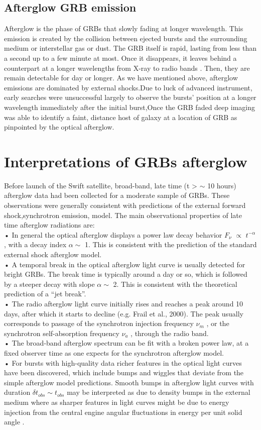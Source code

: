 \subsection{Afterglow GRB emission}
Afterglow is the phase of GRBs that slowly fading at longer wavelength. This emission is created by the collision between ejected bursts and the surrounding medium or interstellar gas or dust. The GRB itself is rapid, lasting from less than a second up to a few minute at most. Once it disappears, it leaves behind a counterpart at a longer wavelengths from X-ray to radio bands . Then, they are remain detectable for day or longer. As we have mentioned above, afterglow emissions are dominated by external shocks.Due to luck of advanced instrument, early searches were unsuccessful largely to observe the bursts’ position at a longer wavelength immediately after the initial burst,Once the GRB faded deep imaging was able to
identify a faint, distance host of galaxy at a location of GRB as pinpointed by the optical afterglow.\citep{15}\citep{22}\citep{23} 
\section{Interpretations of GRBs afterglow }
Before launch of the Swift satellite, broad-band, late time (t > $ \sim $ 10 hours) afterglow data had been collected for a moderate sample of GRBs. These observations were generally consistent with predictions of the external forward shock,synchrotron emission, model. The main observational properties of late time afterglow radiations are:\\
• In general the optical afterglow displays a power law decay behavior $ F_{\nu} $ $ \propto $ $ t^{-\alpha} $   , with a decay index $ \alpha \sim $ 1. This is consistent with the prediction of the standard external shock afterglow model.\\
• A temporal break in the optical afterglow light curve is usually detected for bright GRBs. The break time is typically around a day or so, which is followed by a steeper decay with slope $ \alpha  \sim $ 2. This is consistent with the theoretical prediction of a “jet break”.\\
• The radio afterglow light curve initially rises and reaches a peak around
10 days, after which it starts to decline (e.g. Frail et al., 2000). The peak
usually corresponds to passage of the synchrotron injection frequency $ \nu_{m} $ ,
or the synchrotron self-absorption frequency $ \nu_{a} $ , through the radio band.\\
• The broad-band afterglow spectrum can be fit with a broken power law, at
a fixed observer time as one expects for the synchrotron afterglow model.\\
• For bursts with high-quality data richer features in the optical light curves have been discovered, which include bumps and wiggles that deviate from the simple afterglow model predictions. Smooth bumps in afterglow light curves with duration $ \delta  t _{obs}  \sim  t_{obs} $ may be interpreted as due to density bumps in the external medium  where as sharper features in light curves might be due to energy injection from the central engine  angular fluctuations in energy per unit solid angle \citep{18}.

